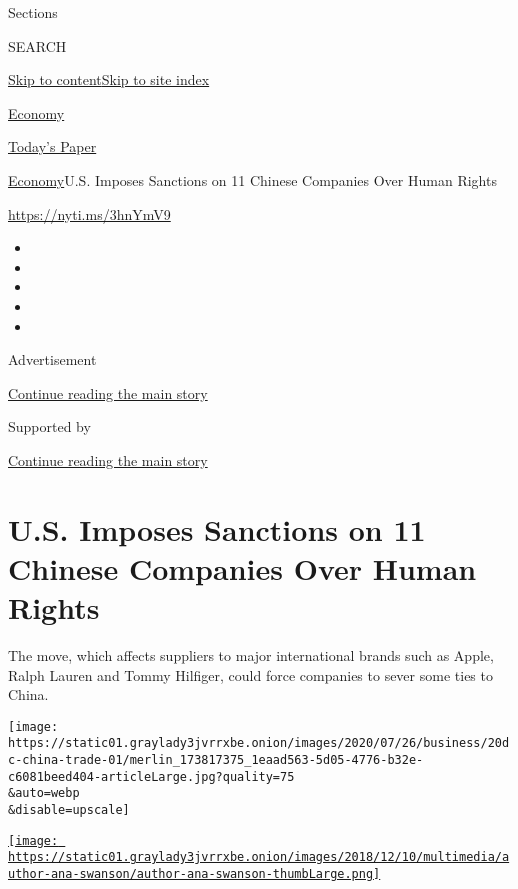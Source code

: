 Sections

SEARCH

\protect\hyperlink{site-content}{Skip to
content}\protect\hyperlink{site-index}{Skip to site index}

\href{https://www.nytimes3xbfgragh.onion/section/business/economy}{Economy}

\href{https://myaccount.nytimes3xbfgragh.onion/auth/login?response_type=cookie\&client_id=vi}{}

\href{https://www.nytimes3xbfgragh.onion/section/todayspaper}{Today's
Paper}

\href{/section/business/economy}{Economy}\textbar{}U.S. Imposes
Sanctions on 11 Chinese Companies Over Human Rights

\url{https://nyti.ms/3hnYmV9}

\begin{itemize}
\item
\item
\item
\item
\item
\end{itemize}

Advertisement

\protect\hyperlink{after-top}{Continue reading the main story}

Supported by

\protect\hyperlink{after-sponsor}{Continue reading the main story}

\hypertarget{us-imposes-sanctions-on-11-chinese-companies-over-human-rights}{%
\section{U.S. Imposes Sanctions on 11 Chinese Companies Over Human
Rights}\label{us-imposes-sanctions-on-11-chinese-companies-over-human-rights}}

The move, which affects suppliers to major international brands such as
Apple, Ralph Lauren and Tommy Hilfiger, could force companies to sever
some ties to China.

\texttt{[image: https://static01.graylady3jvrrxbe.onion/images/2020/07/26/business/20dc-china-trade-01/merlin\_173817375\_1eaad563-5d05-4776-b32e-c6081beed404-articleLarge.jpg?quality=75\\\&auto=webp\\\&disable=upscale]}

\href{https://www.nytimes3xbfgragh.onion/by/ana-swanson}{\texttt{[image: https://static01.graylady3jvrrxbe.onion/images/2018/12/10/multimedia/author-ana-swanson/author-ana-swanson-thumbLarge.png]}}

